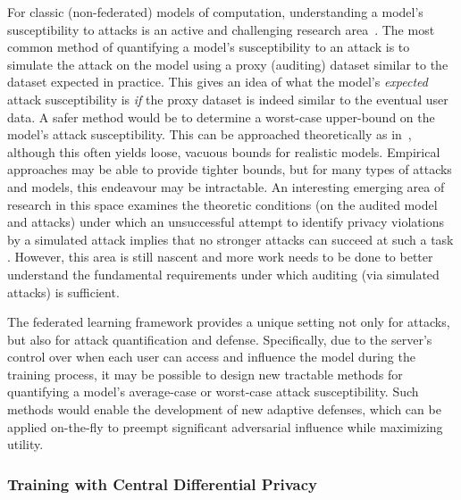 For classic (non-federated) models of computation, understanding a model's susceptibility to attacks is an active and challenging research area~\cite{fredrikson2015model, shokri2017membership, carlini2018secret, melis2018exploiting,carlini2020extracting}.
The most common method of quantifying a model's susceptibility to an attack is to simulate the attack on the model using a proxy (auditing) dataset similar to the dataset expected in practice.
This gives an idea of what the model's \textit{expected} attack susceptibility is \textit{if} the proxy dataset is indeed similar to the eventual user data. A safer method would be to determine a worst-case upper-bound on the model's attack susceptibility. This can be approached theoretically as in~\cite{yeom2018privacy}, although this often yields loose, vacuous bounds for realistic models. Empirical approaches may be able to provide tighter bounds, but for many types of attacks and models, this endeavour may be intractable. An interesting emerging area of research in this space examines the theoretic conditions (on the audited model and attacks) under which an unsuccessful attempt to identify privacy violations by a simulated attack implies that no stronger attacks can succeed at such a task \cite{diaz2019theoretical}. However, this area is still nascent and more work needs to be done to better understand the fundamental requirements under which auditing (via simulated attacks) is sufficient.

The federated learning framework provides a unique setting not only for attacks, but also for attack quantification and defense. Specifically, due to the server's control over when each user can access and influence the model during the training process, it may be possible to design new tractable methods for quantifying a model's average-case or worst-case attack susceptibility. Such methods would enable the development of new adaptive defenses, which can be applied on-the-fly to preempt significant adversarial influence while maximizing utility.

\subsubsection{Training with Central Differential Privacy}
\label{sssec:central_dp}

